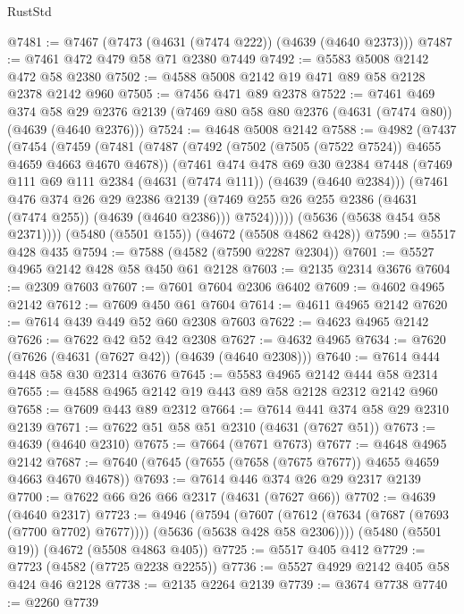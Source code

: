 \begin{lexlean}{RustStd}
\begin{coremodule}
{\begin{coremodule}
{{{{{{{{{{{{{{{{@7481 := @7467 (@7473 (@4631 (@7474 @222)) (@4639 (@4640 @2373)))
@7487 := @7461 @472 @479 @58 @71 @2380 @7449
@7492 := @5583 @5008 @2142 @472 @58 @2380
@7502 := @4588 @5008 @2142 @19 @471 @89 @58 @2128 @2378 @2142 @960
@7505 := @7456 @471 @89 @2378
@7522 := @7461
    @469
    @374
    @58
    @29
    @2376
    @2139
    (@7469 @80 @58 @80 @2376 (@4631 (@7474 @80)) (@4639 (@4640 @2376)))
@7524 := @4648 @5008 @2142
@7588 := @4982
    (@7437
      (@7454
        (@7459
          (@7481
            (@7487
              (@7492 (@7502 (@7505 (@7522 @7524)) @4655 @4659 @4663 @4670 @4678))
              (@7461
                @474
                @478
                @69
                @30
                @2384
                @7448
                (@7469 @111 @69 @111 @2384 (@4631 (@7474 @111)) (@4639 (@4640 @2384)))
                (@7461
                  @476
                  @374
                  @26
                  @29
                  @2386
                  @2139
                  (@7469 @255 @26 @255 @2386 (@4631 (@7474 @255)) (@4639 (@4640 @2386)))
                  @7524)))))
        (@5636 (@5638 @454 @58 @2371))))
    (@5480 (@5501 @155))
    (@4672 (@5508 @4862 @428))
@7590 := @5517 @428 @435
@7594 := @7588 (@4582 (@7590 @2287 @2304))
@7601 := @5527 @4965 @2142 @428 @58 @450 @61 @2128
@7603 := @2135 @2314 @3676
@7604 := @2309 @7603
@7607 := @7601 @7604 @2306 @6402
@7609 := @4602 @4965 @2142
@7612 := @7609 @450 @61 @7604
@7614 := @4611 @4965 @2142
@7620 := @7614 @439 @449 @52 @60 @2308 @7603
@7622 := @4623 @4965 @2142
@7626 := @7622 @42 @52 @42 @2308
@7627 := @4632 @4965
@7634 := @7620 (@7626 (@4631 (@7627 @42)) (@4639 (@4640 @2308)))
@7640 := @7614 @444 @448 @58 @30 @2314 @3676
@7645 := @5583 @4965 @2142 @444 @58 @2314
@7655 := @4588 @4965 @2142 @19 @443 @89 @58 @2128 @2312 @2142 @960
@7658 := @7609 @443 @89 @2312
@7664 := @7614 @441 @374 @58 @29 @2310 @2139
@7671 := @7622 @51 @58 @51 @2310 (@4631 (@7627 @51))
@7673 := @4639 (@4640 @2310)
@7675 := @7664 (@7671 @7673)
@7677 := @4648 @4965 @2142
@7687 := @7640 (@7645 (@7655 (@7658 (@7675 @7677)) @4655 @4659 @4663 @4670 @4678))
@7693 := @7614 @446 @374 @26 @29 @2317 @2139
@7700 := @7622 @66 @26 @66 @2317 (@4631 (@7627 @66))
@7702 := @4639 (@4640 @2317)
@7723 := @4946
    (@7594
      (@7607 (@7612 (@7634 (@7687 (@7693 (@7700 @7702) @7677)))) (@5636 (@5638 @428 @58 @2306))))
    (@5480 (@5501 @19))
    (@4672 (@5508 @4863 @405))
@7725 := @5517 @405 @412
@7729 := @7723 (@4582 (@7725 @2238 @2255))
@7736 := @5527 @4929 @2142 @405 @58 @424 @46 @2128
@7738 := @2135 @2264 @2139
@7739 := @3674 @7738
@7740 := @2260 @7739
}}}}}}}}}}}}}}}}
\end{coremodule}}
\end{coremodule}
\end{lexlean}
